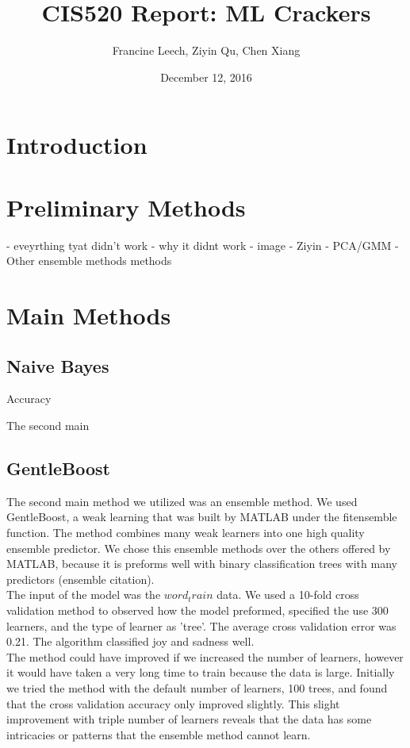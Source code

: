 \documentclass[]{article}
\begin{document}
\title{CIS520 Report: ML Crackers}   %
\author{Francine Leech, Ziyin Qu, Chen Xiang}         %
\date{December 12, 2016}    %
\maketitle

\section{Introduction}


\section{Preliminary Methods}
- eveyrthing tyat didn't work
- why it didnt work 
- image - Ziyin
- PCA/GMM 
- Other ensemble methods methods


\section{Main Methods}

\subsection{Naive Bayes}
Accuracy

The second main

\subsection{GentleBoost}

The second main method we utilized was an ensemble method. We used GentleBoost, a weak learning that was built by MATLAB under the fitensemble function. The method combines many weak learners into one high quality ensemble predictor. We chose this ensemble methods over the others offered by MATLAB, because it is preforms well with binary classification trees with many predictors (ensemble citation). \\

The input of the model was the $word_train$ data. We used a 10-fold cross validation method to observed how the model preformed, specified the use 300 learners, and the type of learner as 'tree'. The average cross validation error was 0.21. The algorithm classified joy and sadness well. \\

The method could have improved if we increased the number of learners, however it would have taken a very long time to train because the data is large. Initially we tried the method with the default number of learners, 100 trees, and found that the cross validation accuracy only improved slightly. This slight improvement with triple number of learners reveals that the data has some intricacies or patterns that the ensemble method cannot learn.   
\end{document}
